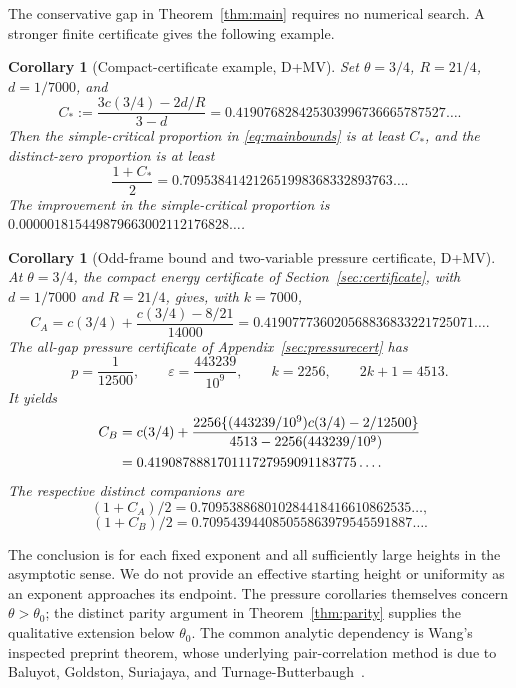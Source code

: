 \documentclass[11pt]{article}
\newtheorem{corollary}[theorem]{Corollary}
\theoremstyle{remark}
\begin{document}
The conservative gap in Theorem~\ref{thm:main} requires no numerical
search. A stronger finite certificate gives the following example.

\begin{corollary}[Compact-certificate example, D+MV]\label{cor:example}
Set $\theta=3/4$, $R=21/4$, $d=1/7000$, and
\[
 C_*:=\frac{3c(3/4)-2d/R}{3-d}
 =0.419076828425303996736665787527\ldots.
\]
Then the simple-critical proportion in \eqref{eq:mainbounds} is at least
$C_*$, and the distinct-zero proportion is at least
\[
 \frac{1+C_*}2=0.709538414212651998368332893763\ldots.
\]
The improvement in the simple-critical proportion is
$0.000001815449879663002112176828\ldots$.
\end{corollary}

\begin{corollary}[Odd-frame bound and two-variable pressure certificate, D+MV]\label{cor:pressureexample}
At $\theta=3/4$, the compact energy certificate of
Section~\ref{sec:certificate}, with $d=1/7000$ and $R=21/4$, gives, with
$k=7000$,
\begin{equation}\label{eq:reuseexample}
 C_A=c(3/4)+\frac{c(3/4)-8/21}{14000}
 =0.419077736020568836833221725071\ldots.
\end{equation}
The all-gap pressure certificate of Appendix~\ref{sec:pressurecert} has
\begin{equation}\label{eq:newparams}
 p=\frac1{12500},\qquad\varepsilon=\frac{443239}{10^9},
 \qquad k=2256,\qquad 2k+1=4513.
\end{equation}
It yields
\begin{align}\label{eq:newexample}
 C_B&=c(3/4)+\frac{2256\{(443239/10^9)c(3/4)-2/12500\}}
                         {4513-2256(443239/10^9)}\notag\\
 &=0.419087888170111727959091183775\ldots.
\end{align}
The respective distinct companions are
\[
 (1+C_A)/2=0.709538868010284418416610862535\ldots,
\]
\[
 (1+C_B)/2=0.709543944085055863979545591887\ldots.
\]
\end{corollary}

The conclusion is for each fixed exponent and all sufficiently large
heights in the asymptotic sense. We do not provide an effective starting
height or uniformity as an exponent approaches its endpoint. The pressure
corollaries themselves concern $\theta>\theta_0$; the distinct parity
argument in Theorem~\ref{thm:parity} supplies the qualitative extension
below $\theta_0$. The common analytic dependency
is Wang's inspected preprint theorem, whose underlying pair-correlation
method is due to Baluyot, Goldston, Suriajaya, and
Turnage-Butterbaugh~\cite{BGSTB,BGSTBcorrection}.
\end{document}
